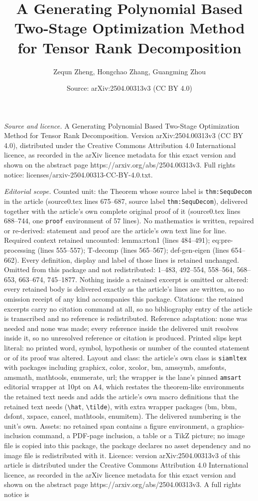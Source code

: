 \documentclass[10pt,a4paper]{amsart}
\title[A Generating Polynomial Based Two-Stage Optimization Method ]{A Generating Polynomial Based Two-Stage Optimization Method for Tensor Rank Decomposition}
\author{Zequn Zheng, Hongchao Zhang, Guangming Zhou}
\date{Source: arXiv:2504.00313v3 (CC BY 4.0)}
\begin{document}
\maketitle

\noindent\emph{Source and licence.} A Generating Polynomial Based Two-Stage Optimization Method for Tensor Rank Decomposition. Version arXiv:2504.00313v3 (CC BY 4.0), distributed under the Creative Commons Attribution 4.0 International licence, as recorded in the arXiv licence metadata for this exact version and shown on the abstract page https://arxiv.org/abs/2504.00313v3. Full rights notice: licenses/arxiv-2504.00313-CC-BY-4.0.txt.\par\smallskip

\noindent\textit{Editorial scope.} Counted unit: the Theorem whose source label is \texttt{thm:SequDecom} in the article (source0.tex lines 675--687, source label \texttt{thm:SequDecom}), delivered together with the article's own complete original proof of it (source0.tex lines 688--744, one \texttt{proof} environment of 57 lines). No mathematics is written, repaired or re-derived: statement and proof are the article's own text line for line. Required context retained uncounted: lemma:rton1 (lines 484--491); eq:pre-processing (lines 555--557); T-decomp (lines 565--567); def-gen-eigen (lines 654--662). Every definition, display and label of those lines is retained unchanged. Omitted from this package and not redistributed: 1--483, 492--554, 558--564, 568--653, 663--674, 745--1877. Nothing inside a retained excerpt is omitted or altered: every retained body is delivered exactly as the article's lines are written, so no omission receipt of any kind accompanies this package. Citations: the retained excerpts carry no citation command at all, so no bibliography entry of the article is transcribed and no reference is redistributed. Reference adaptation: none was needed and none was made; every reference inside the delivered unit resolves inside it, so no unresolved reference or citation is produced. Printed slips kept literal: no printed word, symbol, hypothesis or number of the counted statement or of its proof was altered. Layout and class: the article's own class is \texttt{siamltex} with packages including graphicx, color, xcolor, bm, amssymb, amsfonts, amsmath, mathtools, enumerate, url; the wrapper is the lane's pinned \texttt{amsart} editorial wrapper at 10pt on A4, which restates the theorem-like environments the retained text needs and adds the article's own macro definitions that the retained text needs (\texttt{\textbackslash hat}, \texttt{\textbackslash tilde}), with extra wrapper packages (bm, bbm, dsfont, xspace, cancel, mathtools, enumitem). The delivered numbering is the unit's own. Assets: no retained span contains a figure environment, a graphics-inclusion command, a PDF-page inclusion, a table or a TikZ picture; no image file is copied into this package, the package declares no asset dependency and no image file is redistributed with it. Licence: version arXiv:2504.00313v3 of this article is distributed under the Creative Commons Attribution 4.0 International licence, as recorded in the arXiv licence metadata for this exact version and shown on the abstract page https://arxiv.org/abs/2504.00313v3. A full rights notice is 
\end{document}
